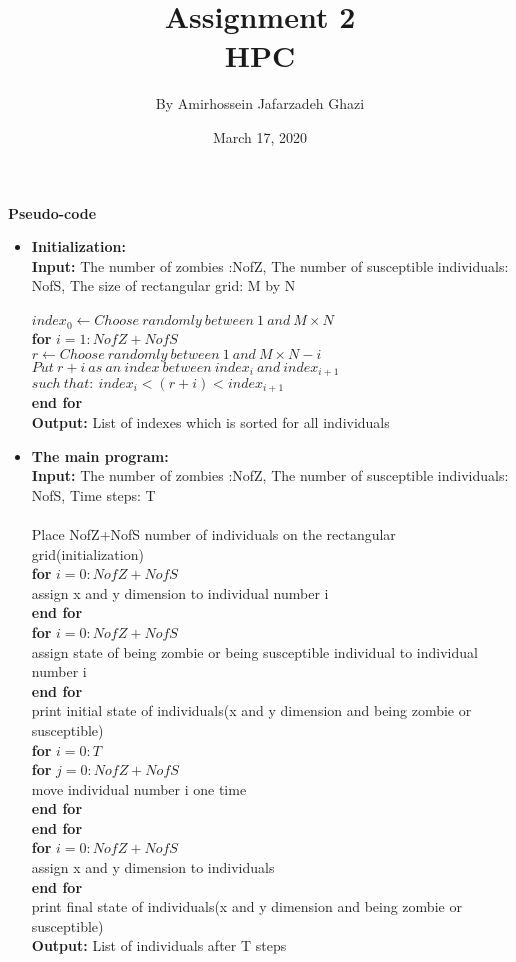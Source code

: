 \documentclass[12pt]{article}
\title{Assignment 2\\HPC}
\author{By Amirhossein Jafarzadeh Ghazi}
\date{March 17, 2020}
\newcommand\tab[1][1cm]{\hspace*{#1}}
\begin{document}
\begin{titlepage}
\maketitle
\end{titlepage}
\hfill \break
\textbf{Pseudo-code}
\begin{itemize}
\item \textbf{Initialization:}\\
\textbf{Input:} The number of zombies :NofZ, The number of susceptible individuals: NofS, The size of rectangular grid: M by N\\\\
$index_0\leftarrow Choose\:randomly\:between\:1\:and\:M \times N$\\
\textbf{for} $i=1:NofZ+NofS$\\
\tab $r\leftarrow Choose\:randomly\:between\:1\:and\:M \times N-i$\\
\tab $Put\:r+i\:as\:an\:index\:between\:index_i\:and\:index_{i+1}\:$\\
\tab\tab\tab\tab\tab$such\:that:\:index_i<(r+i)<index_{i+1}$\\
\textbf{end for}\\
\textbf{Output:} List of indexes which is sorted for all individuals\\
\item \textbf{The main program:}\\
\textbf{Input:} The number of zombies :NofZ, The number of susceptible individuals: NofS, Time steps: T\\\\
Place NofZ+NofS number of individuals on the rectangular grid(initialization)\\
\textbf{for} $i=0:NofZ+NofS$\\
\tab assign x and y dimension to individual number i\\
\textbf{end for}\\
\textbf{for} $i=0:NofZ+NofS$\\
\tab assign state of being zombie or being susceptible individual to individual number i\\
\textbf{end for}\\
print initial state of individuals(x and y dimension and being zombie or susceptible)\\
\textbf{for} $i=0:T$\\
\tab \textbf{for} $j=0:NofZ+NofS$\\
\tab \tab move individual number i one time\\
\tab \textbf{end for}\\
\textbf{end for}\\
\textbf{for} $i=0:NofZ+NofS$\\
\tab assign x and y dimension to individuals\\
\textbf{end for}\\
print final state of individuals(x and y dimension and being zombie or susceptible)\\
\textbf{Output:} List of individuals after T steps\\
\end{itemize}
\end{document}
